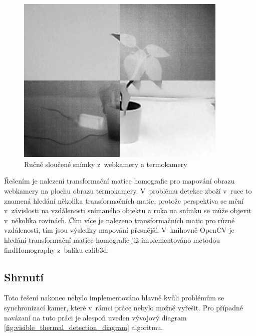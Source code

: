     \begin{figure}[h]
      \centering
      \includegraphics[width=0.9\textwidth]{images/visible_thermal_combined.png}
      \caption{Ručně sloučené snímky z~webkamery a termokamery}
      \label{fig:visible_thermal_combined}
    \end{figure} 

    Řešením je nalezení transformační matice homografie pro mapování obrazu webkamery na plochu obrazu termokamery. V~problému detekce zboží v~ruce to znamená hledání několika transformačních matic, protože perspektiva se mění v~závislosti na vzdálenosti snímaného objektu a ruka na snímku se může objevit v~několika rovinách. Čím více je nalezeno transformačních matic pro různé vzdálenosti, tím jsou výsledky mapování přesnější. V~knihovně OpenCV je hledání transformační matice homografie již implementováno metodou findHomography z~balíku calib3d.

	\subsection{Shrnutí}
    Toto řešení nakonec nebylo implementováno hlavně kvůli problémům se synchronizací kamer, které v~rámci práce nebylo možné vyřešit. Pro případné navázaní na tuto práci je alespoň uveden vývojový  diagram \ref{fig:visible_thermal_detection_diagram} algoritmu.

